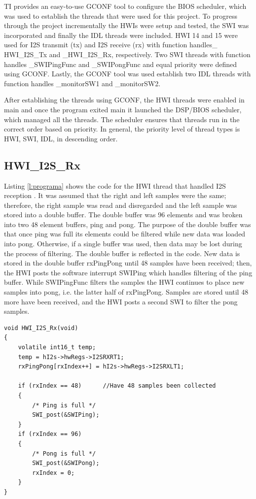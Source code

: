 \documentclass[11pt,pdftex,portrait,letterpaper]{article}
\begin{document}
TI provides an easy-to-use GCONF tool to configure the BIOS scheduler, which was used to establish the threads that were used for this project. To progress through the project incrementally the HWIs were setup and tested, the SWI was incorporated and finally the IDL threads were included. HWI 14 and 15 were used for I2S transmit (tx) and I2S receive (rx) with function handles\_ HWI\_I2S\_Tx and \_HWI\_I2S\_Rx, respectively. Two SWI threads with function handles \_SWIPingFunc and \_SWIPongFunc and equal priority were defined using GCONF. Lastly, the GCONF tool was used establish two IDL threads with function handles \_monitorSW1 and \_monitorSW2.

After establishing the threads using GCONF, the HWI threads were enabled in main and once the program exited main it launched the DSP/BIOS scheduler, which managed all the threads. The scheduler ensures that threads run in the correct order based on priority. In general, the priority level of thread types is HWI, SWI, IDL, in descending order.

\subsection{HWI\_I2S\_Rx}

Listing \ref{l:programa} shows the code for the HWI thread that handled I2S reception . It was assumed that the right and left samples were the same; therefore, the right sample was read and disregarded and the left sample was stored into a double buffer. The double buffer was 96 elements and was broken into two 48 element buffers, ping and pong. The purpose of the double buffer was that once ping was full its elements could be filtered while new data was loaded into pong. Otherwise, if a single buffer was used, then data may be lost during the process of filtering. The double buffer is reflected in the code. New data is stored in the double buffer rxPingPong until 48 samples have been received; then, the HWI posts the software interrupt SWIPing which handles filtering of the ping buffer. While SWIPingFunc filters the samples the HWI continues to place new samples into pong, i.e. the latter half of rxPingPong. Samples are stored until 48 more have been received, and the HWI posts a second SWI to filter the pong samples.

\begin{lstlisting}[caption={I2S receive HWI thread}, label=l:programa]
void HWI_I2S_Rx(void)
{
	volatile int16_t temp;
	temp = hI2s->hwRegs->I2SRXRT1;
	rxPingPong[rxIndex++] = hI2s->hwRegs->I2SRXLT1;

	if (rxIndex == 48)		//Have 48 samples been collected
	{
		/* Ping is full */
		SWI_post(&SWIPing);
	}
	if (rxIndex == 96)
	{
		/* Pong is full */
		SWI_post(&SWIPong);
		rxIndex = 0;
	}
}
\end{lstlisting}
\end{document}
